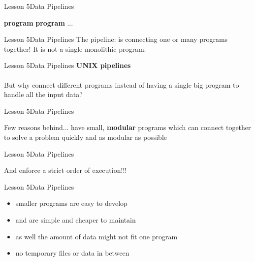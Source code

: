 \documentclass[aspectratio=1610]{beamer}
\begin{document}
\begin{frame}{Lesson 5}{Data Pipelines}
\Huge
\begin{center}
\textbf{program} \text{\textbar} \textbf{program} \text{\textbar} ... 
\end{center}
\end{frame}



\begin{frame}
\end{frame}


\begin{frame}{Lesson 5}{Data Pipelines}
\Huge
The pipeline: is connecting one or many programs together! It is not 
a single monolithic program.
\end{frame}


\begin{frame}{Lesson 5}{Data Pipelines}
\LARGE
\textbf{UNIX pipelines}\\~\\
\Huge
But why connect different programs instead of having a single big 
program to handle all the input data?
\end{frame}


\begin{frame}{Lesson 5}{Data Pipelines}
\Huge
\begin{center}
Few reasons behind... have small, \textbf{modular} programs which can 
connect together to solve a problem quickly and as modular as
possible
\end{center}
\end{frame}

\begin{frame}{Lesson 5}{Data Pipelines}
\Huge
\begin{center}
And \alert{enforce} a strict \alert{order} of execution!!!
\end{center}
\end{frame}


\begin{frame}{Lesson 5}{Data Pipelines}
\huge
\begin{itemize}
    \item smaller programs are easy to develop 
    \item and are simple and cheaper to maintain
    \item as well the amount of data might not fit one program
    \item no temporary files or data in between
\end{itemize}
\end{frame}
\end{document}
